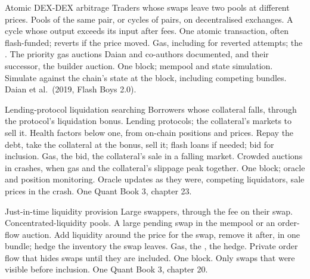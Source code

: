 \begin{strategyfile}{Atomic DEX-DEX arbitrage}\label{strat:hf:on-chain-trading:atomic}
 Traders whose swaps leave two pools at different prices.
 Pools of the same pair, or cycles of pairs, on decentralised exchanges.
 A cycle whose output exceeds its input after fees.
 One atomic transaction, often flash-funded; reverts if the price moved.
 Gas, including for reverted attempts; the .
 The priority gas auctions Daian and co-authors documented, and their successor, the builder auction.
 One block; mempool and state simulation.
 Simulate against the chain's state at the block, including competing bundles.
 Daian et al.\ (2019, Flash Boys 2.0).
\end{strategyfile}

\begin{strategyfile}{Lending-protocol liquidation searching}\label{strat:hf:on-chain-trading:liquidation}
 Borrowers whose collateral falls, through the protocol's liquidation bonus.
 Lending protocols; the collateral's markets to sell it.
 Health factors below one, from on-chain positions and prices.
 Repay the debt, take the collateral at the bonus, sell it; flash loans if needed; bid for inclusion.
 Gas, the bid, the collateral's sale in a falling market.
 Crowded auctions in crashes, when gas and the collateral's slippage peak together.
 One block; oracle and position monitoring.
 Oracle updates as they were, competing liquidators, sale prices in the crash.
 One Quant Book 3, chapter 23.
\end{strategyfile}

\begin{strategyfile}{Just-in-time liquidity provision}\label{strat:hf:on-chain-trading:jit}
 Large swappers, through the fee on their swap.
 Concentrated-liquidity pools.
 A large pending swap in the mempool or an order-flow auction.
 Add liquidity around the price for the swap, remove it after, in one bundle; hedge the inventory the swap leaves.
 Gas, the , the hedge.
 Private order flow that hides swaps until they are included.
 One block.
 Only swaps that were visible before inclusion.
 One Quant Book 3, chapter 20.
\end{strategyfile}

